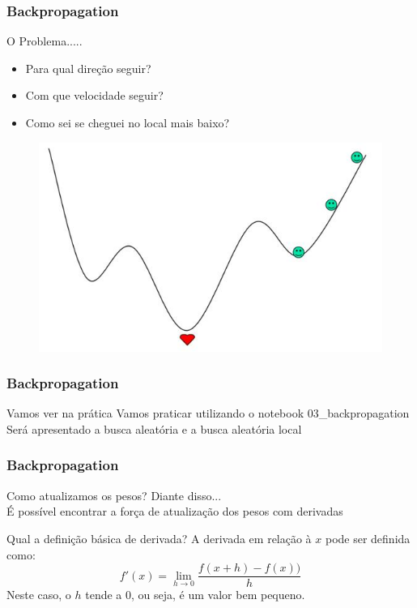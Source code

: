 \documentclass{beamer}
\begin{document}
\begin{frame}
	\frametitle{Backpropagation}
	\begin{example}
		O Problema.....
		\begin{itemize}
			\item Para qual direção seguir?
			\item Com que velocidade seguir?
			\item Como sei se cheguei no local mais baixo?
		\end{itemize}
		
		\begin{figure}
			\centering
			\includegraphics[width=0.5\linewidth]{figures/alpinista.png}
		\end{figure}
		
	\end{example}
\end{frame}
\begin{frame}
	\frametitle{Backpropagation}
	\begin{block}{Vamos ver na prática}
		Vamos praticar utilizando o notebook 03\_backpropagation
		Será apresentado a busca aleatória e a busca aleatória local
	\end{block}
\end{frame}
\begin{frame}
	\frametitle{Backpropagation}
	\begin{block}{Como atualizamos os pesos?}
		Diante disso... \\
		É possível encontrar a força de atualização dos pesos com \alert{derivadas}
		
			\href{https://github.com/mafaldasalomao/pavic_treinamento_ml/blob/main/Machine_Learning/figures/random_01.gif?raw=true}{} 
	\end{block}
	\begin{block}{Qual a definição básica de derivada?}
		A derivada em relação à $x$ pode ser definida como:
		$$f'(x) = \lim_{h\rightarrow 0} \frac{f(x + h) - f (x))}{h}$$
		Neste caso, o $h$ tende a $0$, ou seja, é um valor bem pequeno.
	\end{block}
\end{frame}
\end{document}
